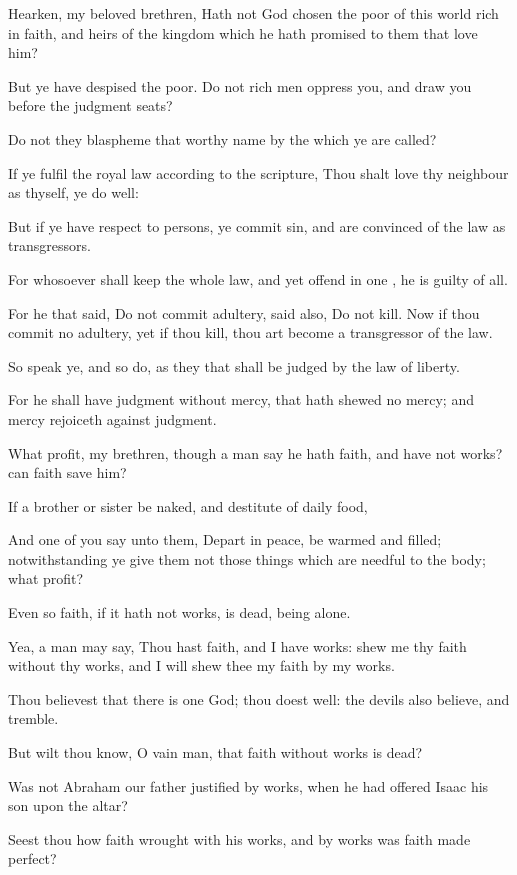 {Hearken,
my
beloved
brethren,
Hath
not
God
chosen the
poor of
this
world
rich
in
faith,
and
heirs of the
kingdom
which he hath
promised to them
that
love
him?

But
ye have
despised the
poor.
Do
not rich
men
oppress
you,
and
draw
you
before the judgment
seats?

Do
not
they
blaspheme that
worthy
name
by the
which
ye are
called?

If ye
fulfil the
royal
law according
to the
scripture, Thou shalt
love
thy
neighbour
as
thyself, ye
do
well:

But
if ye have respect to
persons, ye
commit
sin, and are
convinced
of the
law
as
transgressors.

For
whosoever shall
keep the
whole
law, and
yet
offend
in
one
{}, he
is guilty
of
all.

For he that
said,
Do
not commit
adultery,
said
also,
Do
not
kill.
Now
if thou
commit
no
adultery,
yet if thou
kill, thou art
become a
transgressor of the
law.

So speak
ye,
and
so
do,
as they that
shall be
judged
by the
law of
liberty.

For
he shall have
judgment without
mercy, that hath
shewed
no
mercy;
and
mercy rejoiceth
against
judgment.

What
{}
profit,
my
brethren,
though a
man
say he
hath
faith,
and
have
not
works?
can
faith
save
him?

If a
brother
or
sister
be
naked,
and
destitute of
daily
food,

And
one
of
you
say unto
them,
Depart
in
peace,
be
{}
warmed
and
filled;
notwithstanding ye
give
them
not those things which are
needful to the
body;
what
{}
profit?

Even
so
faith,
if it
hath
not
works,
is
dead,
being
alone.

Yea, a
man may
say,
Thou
hast
faith, and
I
have
works:
shew
me
thy
faith
without
thy
works, and
I will
shew
thee
my
faith
by
my
works.

Thou
believest
that there
is
one
God; thou
doest
well: the
devils
also
believe,
and
tremble.

But wilt
thou
know,
O
vain
man,
that
faith
without
works
is
dead?

Was
not
Abraham
our
father
justified
by
works, when he had
offered
Isaac
his
son
upon the
altar?

Seest
thou
how
faith wrought
with
his
works,
and
by
works
was
faith made
perfect?

}
